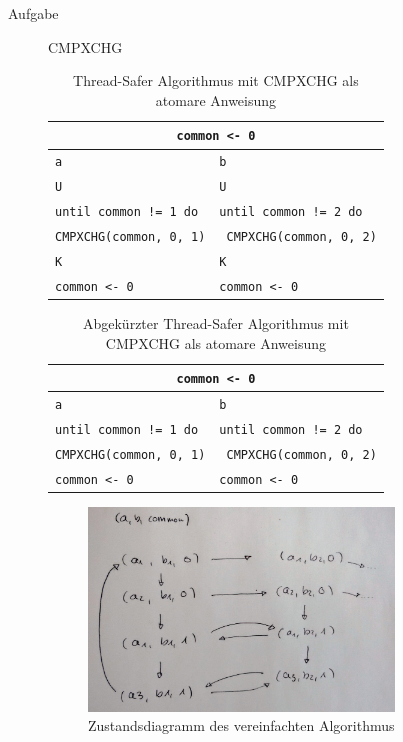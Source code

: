 \documentclass[a4paper,twoside,12pt,fleqn]{article}
\newcounter{AUFGNR}
\newcommand{\AUFGABE}[2]{\vspace{0.3cm}\item[Aufgabe~\arabic{AUFGNR}]\stepcounter{AUFGNR} #1\hfill\emph{#2}}
\begin{document}
\begin{description}
\AUFGABE{CMPXCHG}{}
\begin{table}[h]
\centering
\begin{tabularx}{0.75\textwidth}{l | l}
\multicolumn{2}{c}{\texttt{common <- 0}}\\
\hline
\texttt{a} & \texttt{b}\\
\hline
\texttt{U} & \texttt{U} \\
\texttt{until common != 1 do} & \texttt{until common != 2 do} \\
\texttt{\hspace{2em}CMPXCHG(common, 0, 1)} & \texttt{\hspace{2em} CMPXCHG(common, 0, 2)} \\
\texttt{K} & \texttt{K} \\
\texttt{common <- 0} & \texttt{common <- 0}\\
\end{tabularx}
\caption{Thread-Safer Algorithmus mit CMPXCHG als atomare Anweisung}
\end{table}

\begin{table}[h]
\centering
\begin{tabularx}{0.75\textwidth}{l | l}
\multicolumn{2}{c}{\texttt{common <- 0}}\\
\hline
\texttt{a} & \texttt{b}\\
\hline
\texttt{until common != 1 do} & \texttt{until common != 2 do} \\
\texttt{\hspace{2em}CMPXCHG(common, 0, 1)} & \texttt{\hspace{2em} CMPXCHG(common, 0, 2)} \\
\texttt{common <- 0} & \texttt{common <- 0}\\
\end{tabularx}
\caption{Abgekürzter Thread-Safer Algorithmus mit CMPXCHG als atomare Anweisung}
\end{table}

\begin{figure}[htbp] 
  \centering
     \includegraphics[width=0.8\textwidth]{zustand.jpg}
  \caption{Zustandsdiagramm des vereinfachten Algorithmus}
  \label{zsd}
\end{figure}


\end{description}
\end{document}

